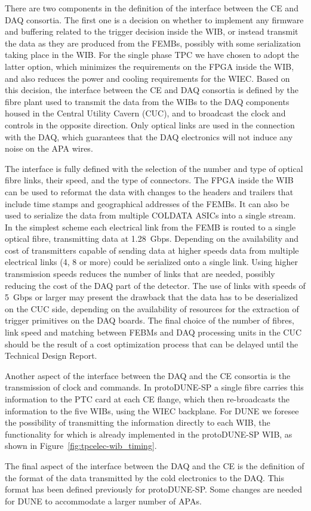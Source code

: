 There are two components in the definition of the interface between the CE
and DAQ consortia. The first one is a decision on whether to implement any
firmware and buffering related to the trigger decision inside the WIB, or
instead transmit the data as they are produced from the FEMBs, possibly with
some serialization taking place in the WIB. For the single phase TPC we have
chosen to adopt the latter option, which minimizes the requirements on the
FPGA inside the WIB, and also reduces the power and cooling requirements for the WIEC.
Based on this decision, the interface between the CE and DAQ consortia is
defined by the fibre plant
used to transmit the data from the WIBs to the DAQ components housed in the
Central Utility Cavern (CUC), and to broadcast the clock and controls in the
opposite direction. Only optical links are used in the connection with the DAQ,
which guarantees that the DAQ electronics will not induce any noise on the
APA wires.

The interface is fully defined with the selection of the number
and type of optical fibre links, their speed, and the type of connectors.
The FPGA inside the WIB can be used to reformat the data with changes to
the headers and trailers that include time stamps and geographical addresses
of the FEMBs. It can also be used to serialize the data from multiple
COLDATA ASICs into a single stream. In the simplest scheme each electrical
link from the FEMB is routed to a single optical fibre, transmitting data
at 1.28~Gbps. Depending on the availability and cost of transmitters
capable of sending data at higher speeds data from multiple electrical
links (4, 8 or more) could be serialized onto a single link. Using higher transmission
speeds reduces the number of links that are needed, possibly reducing the
cost of the DAQ part of the detector. The use of links with speeds
of 5~Gbps or larger may present the
drawback that the data has to be deserialized on the CUC side, depending
on the availability of resources for the extraction of trigger primitives
on the DAQ boards. The final choice of the number of fibres, link speed and
matching between FEBMs and DAQ processing units in the CUC should be
the result of a cost optimization process that can be delayed until
the Technical Design Report.

Another aspect of the interface between the DAQ and the CE consortia is the
transmission of clock and commands. In protoDUNE-SP a single fibre
carries this information to the PTC card at each CE flange, which then re-broadcasts
the information to the five WIBs, using the WIEC backplane. For DUNE we
foresee the possibility of transmitting the information directly to each
WIB, the functionality for which is already implemented in the protoDUNE-SP WIB, as
shown in Figure~\ref{fig:tpcelec-wib_timing}.

The final aspect of the interface between the DAQ and the CE is
the definition of the format of the data transmitted by the cold electronics
to the DAQ.  This format has been defined previously for protoDUNE-SP.
Some changes are needed for DUNE to accommodate a larger number of APAs.

